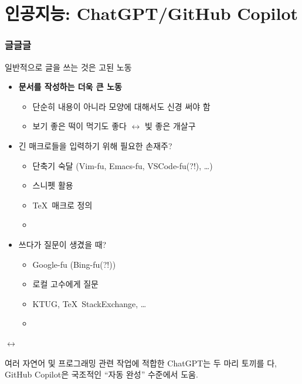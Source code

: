 \section{인공지능: ChatGPT/GitHub Copilot}
\begin{frame}[c]
  \frametitle{글글글}
  일반적으로 글을 쓰는 것은 고된 노동
  \pause
  \begin{itemize}
    \item<2-> \textbf{ 문서를 작성하는 더욱 큰 노동}
      \begin{itemize}
        \item 단순히 내용이 아니라 모양에 대해서도 신경 써야 함
        \item 보기 좋은 떡이 먹기도 좋다 $\leftrightarrow$ 빛 좋은 개살구
      \end{itemize}

    \item<3-> 긴 매크로들을 입력하기 위해 필요한 손재주?
      \begin{itemize}
        \item 단축기 숙달 (Vim-fu, Emacs-fu, VSCode-fu(?!), \ldots)
        \item 스니펫 활용
        \item \TeX\ 매크로 정의
        \item<4-> 
      \end{itemize}

      \item<5->  쓰다가 질문이 생겼을 때?
        \begin{itemize}
          \item Google-fu (Bing-fu(?!))
          \item 로컬 고수에게 질문
          \item KTUG, \TeX\ StackExchange, \ldots
          \item<6-> 
        \end{itemize}
  \end{itemize}
\end{frame}

\begin{frame}[c]
  \begin{center}
    {\large
       $\leftrightarrow$  \\
    }

    \pause
    여러 자연어 및 프로그래밍 관련 작업에 적합한 ChatGPT는 두 마리 토끼를 다,
    GitHub Copilot은 국조적인 ``자동 완성'' 수준에서 도움.
  \end{center}
\end{frame}


